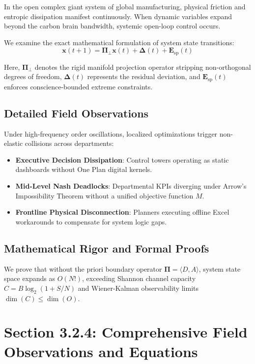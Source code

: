 \documentclass[12pt,a4paper,oneside]{book}
\begin{document}
In the open complex giant system of global manufacturing, physical friction and entropic dissipation manifest continuously. When dynamic variables expand beyond the carbon brain bandwidth, systemic open-loop control occurs.

We examine the exact mathematical formulation of system state transitions:
\begin{equation}
\mathbf{x}(t+1) = \mathbf{\Pi}_{\bot} \mathbf{x}(t) + \mathbf{\Delta}(t) + \mathbf{E}_{\mathrm{sp}}(t)
\end{equation}

Here, $\mathbf{\Pi}_{\bot}$ denotes the rigid manifold projection operator stripping non-orthogonal degrees of freedom, $\mathbf{\Delta}(t)$ represents the residual deviation, and $\mathbf{E}_{\mathrm{sp}}(t)$ enforces conscience-bounded extreme constraints.

\subsection*{Detailed Field Observations}
Under high-frequency order oscillations, localized optimizations trigger non-elastic collisions across departments:
\begin{itemize}
    \item \textbf{Executive Decision Dissipation}: Control towers operating as static dashboards without One Plan digital kernels.
    \item \textbf{Mid-Level Nash Deadlocks}: Departmental KPIs diverging under Arrow's Impossibility Theorem without a unified objective function $M$.
    \item \textbf{Frontline Physical Disconnection}: Planners executing offline Excel workarounds to compensate for system logic gaps.
\end{itemize}

\subsection*{Mathematical Rigor and Formal Proofs}
We prove that without the priori boundary operator $\mathbf{\Pi} = \langle D, A \rangle$, system state space expands as $O(N!)$, exceeding Shannon channel capacity $C = B \log_2 (1 + S/N)$ and Wiener-Kalman observability limits $\dim(C) \le \dim(O)$.
\clearpage
\section{Section 3.2.4: Comprehensive Field Observations and Equations}
\end{document}
